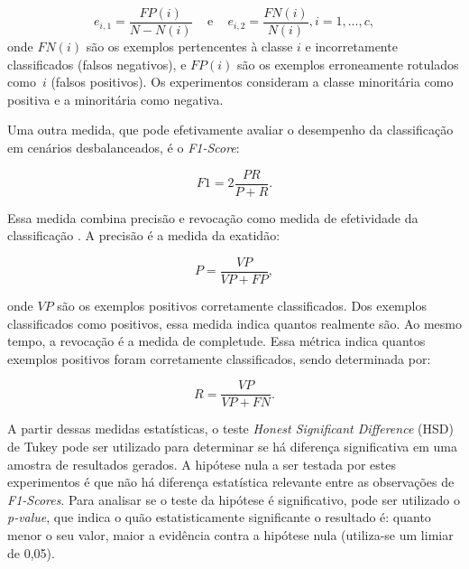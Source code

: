 \begin{equation*}
  e_{i,1} = \frac{FP(i)}{N-N(i)} \,\,\,\,\, \text{ e } \,\,\,\,\, e_{i,2} = \frac{FN(i)}{N(i)}, i=1,...,c,
\label{eq:Errors}
\end{equation*}
\noindent onde $FN(i)$ são os exemplos pertencentes à classe $i$ e incorretamente classificados (falsos negativos), e $FP(i)$ são os exemplos erroneamente rotulados como~$i$ (falsos positivos). Os experimentos consideram a classe minoritária como positiva e a minoritária como negativa.

Uma outra medida, que pode efetivamente avaliar o desempenho da classificação em cenários desbalanceados, é o \textit{F1-Score}:

\begin{equation*}
  F1 = 2 \frac{PR}{P+R}.
\end{equation*}

Essa medida combina precisão e revocação como medida de efetividade da classificação \cite{Garcia2009}. A precisão é a medida da exatidão:

\begin{equation*}
  P = \frac{VP}{VP + FP},
\end{equation*}

\noindent onde $VP$ são os exemplos positivos corretamente classificados. Dos exemplos classificados como positivos, essa medida indica quantos realmente são. Ao mesmo tempo, a revocação é a medida de completude. Essa métrica indica quantos exemplos positivos foram corretamente classificados, sendo determinada por:

\begin{equation*}
  R = \frac{VP}{VP + FN}.
\end{equation*}

A partir dessas medidas estatísticas, o teste \textit{Honest Significant Difference} (HSD) de Tukey pode ser utilizado para determinar se há diferença significativa em uma amostra de resultados gerados. A hipótese nula a ser testada por estes experimentos é que não há diferença estatística relevante entre as observações de \textit{F1-Scores}. Para analisar se o teste da hipótese é significativo, pode ser utilizado o \textit{p-value}, que indica o quão estatisticamente significante o resultado é: quanto menor o seu valor, maior a evidência contra a hipótese nula (utiliza-se um limiar de 0,05).


